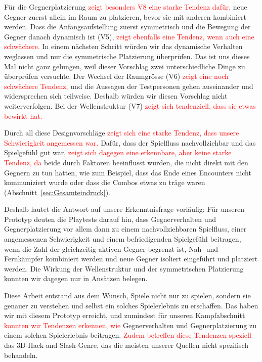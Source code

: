 \documentclass[../Main.tex]{subfiles}
\begin{document}
Für die Gegnerplatzierung \textcolor{red}{zeigt besonders V8 eine starke Tendenz dafür,} neue Gegner zuerst allein im Raum zu platzieren, bevor sie mit anderen kombiniert werden. Dass die Anfangsaufstellung zuerst symmetrisch und die Bewegung der Gegner danach dynamisch ist (V5), \textcolor{red}{zeigt ebenfalls eine Tendenz, wenn auch eine schwächere.} In einem nächsten Schritt würden wir das dynamische Verhalten weglassen und nur die symmetrische Platzierung überprüfen. Das ist uns dieses Mal nicht ganz gelungen, weil dieser Vorschlag zwei unterschiedliche Dinge zu überprüfen versuchte. Der Wechsel der Raumgrösse (V6) \textcolor{red}{zeigt eine noch schwächere Tendenz,} und die Aussagen der Testpersonen gehen auseinander und widersprechen sich teilweise. Deshalb würden wir diesen Vorschlag nicht weiterverfolgen. Bei der Wellenstruktur (V7) \textcolor{red}{zeigt sich tendenziell, dass sie etwas bewirkt hat.}

Durch all diese Designvorschläge \textcolor{red}{zeigt sich eine starke Tendenz, dass unsere Schwierigkeit angemessen war.} Dafür, dass der Spielfluss nachvollziehbar und das Spielgefühl gut war, \textcolor{red}{zeigt sich dagegen \textcolor{red}{eine erkennbare, aber keine starke Tendenz}, da} beide durch Faktoren beeinflusst wurden, die nicht direkt mit den Gegnern zu tun hatten, wie zum Beispiel, dass das Ende eines Encounters nicht kommuniziert wurde oder dass die Combos etwas zu träge waren (Abschnitt~\ref{sec:Gesamteindruck}).

Deshalb lautet die Antwort auf unsere Erkenntnisfrage vorläufig: Für unseren Prototyp deuten die Playtests darauf hin, dass Gegnerverhalten und Gegnerplatzierung vor allem dann zu einem nachvollziehbaren Spielfluss, einer angemessenen Schwierigkeit und einem befriedigenden Spielgefühl beitragen, wenn die Zahl der gleichzeitig aktiven Gegner begrenzt ist, Nah- und Fernkämpfer kombiniert werden und neue Gegner isoliert eingeführt und platziert werden. Die Wirkung der Wellenstruktur und der symmetrischen Platzierung konnten wir dagegen nur in Ansätzen belegen.

Diese Arbeit entstand aus dem Wunsch, Spiele nicht nur zu spielen, sondern sie genauer zu verstehen und selbst ein solches Spielerlebnis zu erschaffen. Das haben wir mit diesem Prototyp erreicht, und zumindest für unseren Kampfabschnitt \textcolor{red}{konnten wir Tendenzen erkennen, wie} Gegnerverhalten und Gegnerplatzierung zu einem solchen Spielerlebnis beitragen. \textcolor{red}{Zudem betreffen diese Tendenzen speziell} das 3D-Hack-and-Slash-Genre, das die meisten unserer Quellen nicht spezifisch behandeln.
\end{document}

